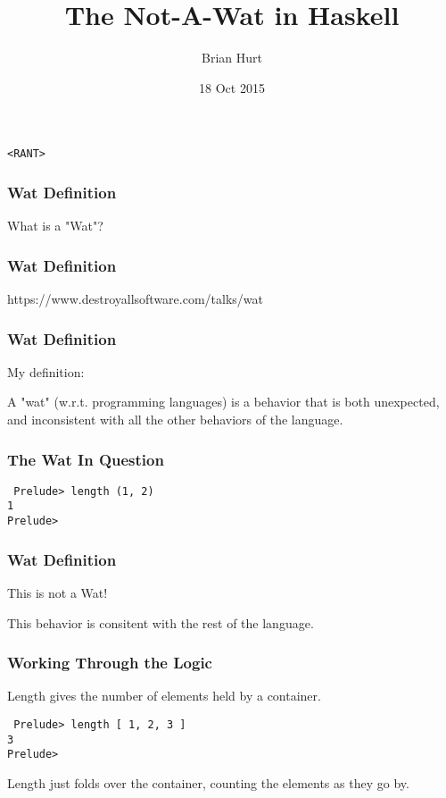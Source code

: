 \documentclass{beamer}
\title{The Not-A-Wat in Haskell}
\author{Brian Hurt}
\date{18 Oct 2015}
\begin{document}
\begin{frame}
    \titlepage
\end{frame}

\begin{frame}
\begin{center}{\tt \Huge <RANT>}\end{center}
\end{frame}

\begin{frame}
\frametitle{Wat Definition}
\begin{center}\Large{What is a "Wat"?}\end{center}
\end{frame}

\begin{frame}
\frametitle{Wat Definition}
\begin{center}\Large{https://www.destroyallsoftware.com/talks/wat}\end{center}
\end{frame}

\begin{frame}
\frametitle{Wat Definition}
\begin{center}
My definition:

A "wat" (w.r.t. programming languages) is a behavior that is both
unexpected, and inconsistent with all the other behaviors of the
language.
\end{center}
\end{frame}

\begin{frame}[fragile]
\frametitle{The Wat In Question}
{\tt \Large{
Prelude> length (1, 2)\\
1\\
Prelude> 
}}
\end{frame}

\begin{frame}
\frametitle{Wat Definition}
\begin{center}
{\Huge This is not a Wat!}

This behavior is consitent with the rest of the language.
\end{center}
\end{frame}

\begin{frame}[fragile]
\frametitle{Working Through the Logic}
{\Large
Length gives the number of elements held by a container.

\vspace{20pt}

{\tt
Prelude> length [ 1, 2, 3 ]\\
3\\
Prelude> 
}

\vspace{20pt}

Length just folds over the container, counting the elements as they go by.

}


\end{frame}
\end{document}
